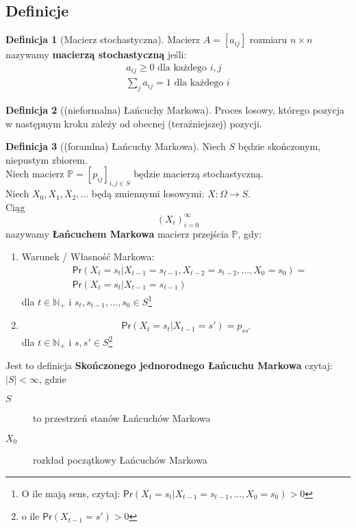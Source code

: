 \documentclass[a4paper,12pt]{article}
\theoremstyle{definition}%
\theoremstyle{definition}
\newtheorem{definition}{Definicja}%
\theoremstyle{problem}
\begin{document}
\subsection{Definicje}
\begin{definition}[Macierz stochastyczna]
Macierz $A=[a_{ij}]$ rozmiaru $n\times n$ nazywamy \textbf{macierzą stochastyczną} jeśli:
\begin{align*}
a_{ij}\geq 0 \text{ dla każdego }i,j\\
\sum_j a_{ij}=1 \text{ dla każdego } i 
\end{align*}
\end{definition}
\begin{definition}[(nieformalna) Łańcuchy Markowa]
Proces losowy, którego pozycja w następnym kroku zależy od obecnej (teraźniejszej) pozycji.
\end{definition}
\begin{definition}[(foramlna) Łańcuchy Markowa]
Niech $S$ będzie skończonym, niepustym zbiorem.\\
Niech macierz $\mathbb{P}=[p_{ij}]_{i,j\in S}$ będzie macierzą stochastyczną.\\
Niech $X_0, X_1, X_2,...$ będą zmiennymi losowymi: $X: \Omega \rightarrow S$.\\
Ciąg $$(X_i)_{i=0}^\infty$$ nazywamy \textbf{Łańcuchem Markowa} macierz przejścia $\mathbb{P}$, gdy:
\begin{enumerate}[label=\arabic*.]
\item Warunek / Własność Markowa:
\begin{align*}
&\mathsf{Pr}(X_t=s_t|X_{t-1}=s_{t-1},X_{t-2}=s_{t-2},...,X_0=s_0)=\\
&\mathsf{Pr}(X_t=s_t|X_{t-1}=s_{t-1})
\end{align*} dla $t\in \mathbb{N}_+$ i $s_t, s_{t-1},...,s_0\in S$\footnote{O ile mają sens, czytaj: $\mathsf{Pr}(X_t=s_t|X_{t-1}=s_{t-1},...,X_0=s_0)>0$}
\item $$\mathsf{Pr}(X_t=s_t|X_{t-1}=s')=p_{ss'}$$ dla $t\in \mathbb{N}_+$ i $s,s'\in S$\footnote{o ile $\mathsf{Pr}(X_{t-1}=s')>0$}
\end{enumerate}
Jest to definicja \textbf{Skończonego jednorodnego Łańcuchu Markowa} czytaj: $|S|<\infty$, gdzie 
\begin{description}
\item[$S$] to przestrzeń stanów Łańcuchów Markowa
\item[$X_0$] rozkład początkowy Łańcuchów Markowa
\end{description}
\end{definition}
\end{document}
